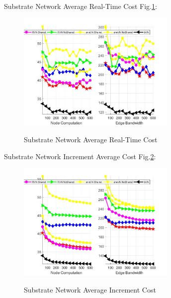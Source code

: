 Substrate Network Average Real-Time  Cost Fig.\ref{fig:CostCurrentAverageSubstrateNetwork}:
\begin{figure}
  \centering
  \includegraphics[width=3in]{Fig/CostCurrentAverageSubstrateNetwork}\\
  \caption{Substrate Network Average Real-Time Cost}\label{fig:CostCurrentAverageSubstrateNetwork}
\end{figure}

Substrate Network Increment Average Cost Fig.\ref{fig:CostAccumulateAverageSubstrateNetwork}:
\begin{figure}
  \centering
  \includegraphics[width=3in]{Fig/CostAccumulateAverageSubstrateNetwork}\\
  \caption{Substrate Network Average Increment Cost }\label{fig:CostAccumulateAverageSubstrateNetwork}
\end{figure}



